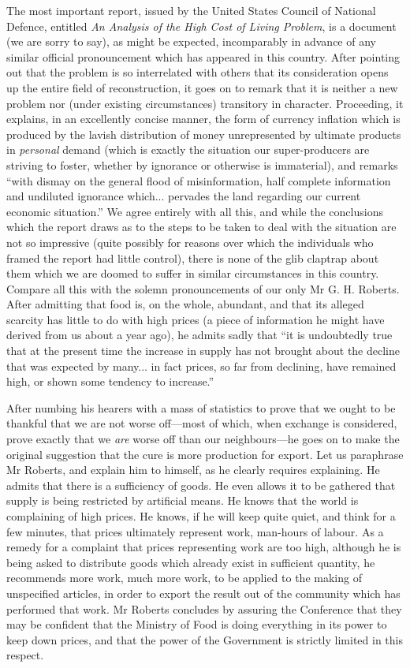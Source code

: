 \documentclass{book}
\begin{document}
The most important report, issued by the United States Council of National Defence, entitled \emph{An Analysis of the High Cost of Living Problem}, is a document (we are sorry to say), as might be expected, incomparably in advance of any similar official pronouncement which has appeared in this country. After pointing out that the problem is so interrelated with others that its consideration opens up the entire field of reconstruction, it goes on to remark that it is neither a new problem nor (under existing circumstances) transitory in character. Proceeding, it explains, in an excellently concise manner, the form of currency inflation which is produced by the lavish distribution of money unrepresented by ultimate products in \emph{personal} demand (which is exactly the situation our super-producers are striving to foster, whether by ignorance or otherwise is immaterial), and remarks “with dismay on the general flood of misinformation, half complete information and undiluted ignorance which... pervades the land regarding our current economic situation.” We agree entirely with all this, and while the conclusions which the report draws as to the steps to be taken to deal with the situation are not so impressive (quite possibly for reasons over which the individuals who framed the report had little control), there is none of the glib claptrap about them which we are doomed to suffer in similar circumstances in this country. Compare all this with the solemn pronouncements of our only Mr G. H. Roberts. After admitting that food is, on the whole, abundant, and that its alleged scarcity has little to do with high prices (a piece of information he might have derived from us about a year ago), he admits sadly that “it is undoubtedly true that at the present time the increase in supply has not brought about the decline that was expected by many... in fact prices, so far from declining, have remained high, or shown some tendency to increase.”

After numbing his hearers with a mass of statistics to prove that we ought to be thankful that we are not worse off—most of which, when exchange is considered, prove exactly that we \emph{are} worse off than our neighbours—he goes on to make the original suggestion that the cure is more production for export. Let us paraphrase Mr Roberts, and explain him to himself, as he clearly requires explaining. He admits that there is a sufficiency of goods. He even allows it to be gathered that supply is being restricted by artificial means. He knows that the world is complaining of high prices. He knows, if he will keep quite quiet, and think for a few minutes, that prices ultimately represent work, man-hours of labour. As a remedy for a complaint that prices representing work are too high, although he is being asked to distribute goods which already exist in sufficient quantity, he recommends more work, much more work, to be applied to the making of unspecified articles, in order to export the result out of the community which has performed that work. Mr Roberts concludes by assuring the Conference that they may be confident that the Ministry of Food is doing everything in its power to keep down prices, and that the power of the Government is strictly limited in this respect.
\end{document}
